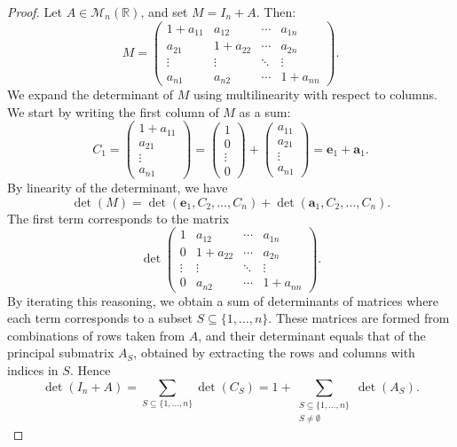 \documentclass[12pt]{article}
\begin{document}
\begin{proof}
Let $A \in \mathcal{M}_n(\mathbb{R})$, and set $M = I_n + A$. Then:
\[
M =
\begin{pmatrix}
1 + a_{11} & a_{12} & \cdots & a_{1n} \\
a_{21} & 1 + a_{22} & \cdots & a_{2n} \\
\vdots & \vdots & \ddots & \vdots \\
a_{n1} & a_{n2} & \cdots & 1 + a_{nn}
\end{pmatrix}.
\]
We expand the determinant of $M$ using multilinearity with respect to columns. We start by writing the first column of $M$ as a sum:
\[
C_1 =
\begin{pmatrix}
1 + a_{11} \\
a_{21} \\
\vdots \\
a_{n1}
\end{pmatrix}
=
\begin{pmatrix}
1 \\
0 \\
\vdots \\
0
\end{pmatrix}
+
\begin{pmatrix}
a_{11} \\
a_{21} \\
\vdots \\
a_{n1}
\end{pmatrix}
= \mathbf{e}_1 + \mathbf{a}_1.
\]
By linearity of the determinant, we have
\[
\det(M) = \det(\mathbf{e}_1, C_2, \dots, C_n) + \det(\mathbf{a}_1, C_2, \dots, C_n).
\]
The first term corresponds to the matrix
\[
\det\begin{pmatrix}
1 & a_{12} & \cdots & a_{1n} \\
0 & 1 + a_{22} & \cdots & a_{2n} \\
\vdots & \vdots & \ddots & \vdots \\
0 & a_{n2} & \cdots & 1 + a_{nn}
\end{pmatrix}.
\]
By iterating this reasoning, we obtain a sum of determinants of matrices where each term corresponds to a subset $S \subseteq \{1, \dots, n\}$. These matrices are formed from combinations of rows taken from $A$, and their determinant equals that of the principal submatrix $A_S$, obtained by extracting the rows and columns with indices in $S$.
Hence
\[
\det(I_n + A) = \sum_{S \subseteq \{1, \dots, n\}} \det(C_S) = 1 + \sum_{\substack{S \subseteq \{1, \dots, n\} \\ S \neq \emptyset}} \det(A_S).
\]
\end{proof}
\end{document}

